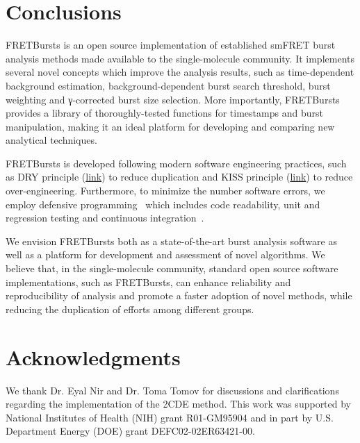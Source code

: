 \section{Conclusions}
\label{sec:conclusions}

FRETBursts is an open source implementation of established smFRET burst analysis methods
made available to the single-molecule community.
It implements several novel concepts which improve the analysis results, such as
time-dependent background estimation, background-dependent burst search threshold,
burst weighting and γ-corrected burst size selection.
More importantly, FRETBursts provides a library of thoroughly-tested functions
for timestamps and burst manipulation, making it an ideal platform for
developing and comparing new analytical techniques.

FRETBursts is developed following modern software engineering practices,
such as DRY principle
(\href{http://en.wikipedia.org/wiki/Don\%27t_repeat_yourself}{link})
to reduce duplication and KISS principle
(\href{http://en.wikipedia.org/wiki/KISS_principle}{link})
to reduce over-engineering. Furthermore, to minimize the number software errors,
we employ defensive programming~\cite{Prli__2012} which includes code readability,
unit and regression testing and continuous integration~\cite{Eglen_2016}.

We envision FRETBursts both as a state-of-the-art burst analysis
software as well as a platform for development and assessment of novel algorithms.
We believe that, in the single-molecule community,
standard open source software implementations, such as FRETBursts, can enhance
reliability and reproducibility of analysis and promote a faster adoption of novel methods, 
while reducing the duplication of efforts among different groups.

\section*{Acknowledgments}
We thank Dr. Eyal Nir and Dr. Toma Tomov for discussions and clarifications regarding the 
implementation of the 2CDE method.
This work was supported by National Institutes of Health (NIH)
grant R01-GM95904 and in part by U.S. Department Energy (DOE) grant DEFC02-02ER63421-00.

